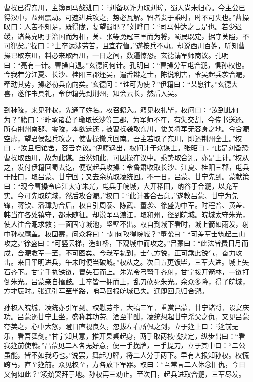 曹操已得东川，主簿司马懿进曰：“刘备以诈力取刘璋，蜀人尚未归心。今主公已得汉中，益州震动。可速进兵攻之，势必瓦解。智者贵于乘时，时不可失也。”曹操叹曰：人苦不知足，既得陇，复望蜀耶？”刘晔曰：“司马仲达之言是也。若少迟缓，诸葛亮明于治国而为相，关、张等勇冠三军而为将，蜀民既定，据守关隘，不可犯矣。”操曰：“士卒远涉劳苦，且宜存恤。”遂按兵不动。却说西川百姓，听知曹操已取东川，料必来取西川，一日之间，数遍惊恐。玄德请军师商议。孔明曰：“亮有一计。曹操自退。”玄德问何计。孔明曰：“曹操分军屯合淝，惧孙权也。今我若分江夏、长沙、桂阳三郡还吴，遣舌辩之士，陈说利害，令吴起兵袭合淝，牵动其势，操必勒兵南向矣。”玄德问：“谁可为使？”伊籍曰：“某愿往。”玄德大喜，遂作书具礼，令伊籍先到荆州，知会云长，然后入吴。

到秣陵，来见孙权，先通了姓名。权召籍入。籍见权礼毕，权问曰：“汝到此何为？”籍曰：“昨承诸葛子瑜取长沙等三郡，为军师不在，有失交割，今传书送还。所有荆州南郡、零陵，本欲送还；被曹操袭取东川，使关将军无容身之地。今合淝空虚，望君侯起兵攻之，使曹操撤兵回南。吾主若取了东川，即还荆州全土。”权曰：“汝且归馆舍，容吾商议。”伊籍退出，权问计于众谋士。张昭曰：“此是刘备恐曹操取西川，故为此谋。虽然如此，可因操在汉中。乘势取合淝，亦是上计。”权从之，发付伊籍回蜀去讫，便议起兵攻操：令鲁肃收取长沙、江夏、桂阳三郡，屯兵于陆口，取吕蒙、甘宁回；又去余杭取凌统回。不一日，吕蒙、甘宁先到。蒙献策曰：“现今曹操令庐江太守朱光，屯兵于皖城，大开稻田，纳谷于合淝，以充军实。今可先取皖城，然后攻合淝。”权曰：“此计甚合吾意。”遂教吕蒙、甘宁为先锋，蒋钦、潘璋为合后，权自引周泰、陈武、董袭、徐盛为中军。时程普、黄盖、韩当在各处镇守，都未随征。却说军马渡江，取和州，径到皖城。皖城太守朱光，使人往合淝求救；一面固守城池，坚壁不出。权自到城下看时，城上箭如雨发，射中孙权麾盖。权回寨，问众将曰：“如何取得皖城？”董袭曰：“可差军士筑起土山攻之。”徐盛曰：“可竖云梯，造虹桥，下观城中而攻之。”吕蒙曰：“此法皆费日月而成，合淝救军一至，不可图矣。今我军初到，士气方锐，正可乘此锐气，奋力攻击。来日平明进兵，午未时便当破城。”权从之。次日五更饭毕，三军大进。城上矢石齐下。甘宁手执铁链，冒矢石而上。朱光令弓弩手齐射，甘宁拨开箭林，一链打倒朱光。吕蒙亲自擂鼓。士卒皆一拥而上，乱刀砍死朱光。余众多降，得了皖城，方才辰时。张辽引军至半路，哨马回报皖城已失。辽即回兵归合淝。

孙权入皖城，凌统亦引军到。权慰劳毕，大犒三军，重赏吕蒙，甘宁诸将，设宴庆功。吕蒙逊甘宁上坐，盛称其功劳。酒至半酣，凌统想起甘宁杀父之仇，又见吕蒙夸美之，心中大怒，瞪目直视良久，忽拔左右所佩之剑，立于筵上曰：“筵前无乐，看吾舞剑。”甘宁知其意，推开果桌起身，两手取两枝戟挟定，纵步出曰：“看我筵前使戟。”吕蒙见二人各无好意，便一手挽牌，一手提刀，立于其中曰：“二公虽能，皆不如我巧也。”说罢，舞起刀牌，将二人分于两下。早有人报知孙权。权慌跨马，直至筵前。众见权至，方各放下军器。权曰：“吾常言二人休念旧仇，今日又何如此？”凌统哭拜于地。孙权再三劝止。至次日，起兵进取合淝，三军尽发。

